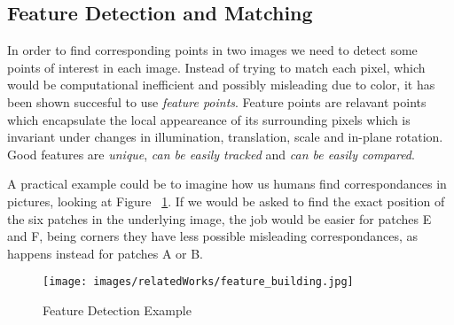  \subsection{Feature Detection and Matching }
 In order to find corresponding points in two images we need to detect some points of interest in each image.
 Instead of trying to match each pixel, which would be computational inefficient and possibly misleading due to color,
 it has been shown succesful to use \textit{feature points}. Feature points are relavant points which encapsulate the local
 appeareance of its surrounding pixels which is invariant under changes in illumination, translation, scale and in-plane rotation.
 Good features are \textit{unique}, \textit{can be easily tracked} and \textit{can be easily compared}.

 A practical example could be to imagine how us humans find correspondances in pictures, looking at Figure
~\ref{fig:sfm_opencv}. If we would be asked to find the exact position of the six patches in the underlying image,
the job would be easier for patches E and F, being corners they have less possible misleading correspondances, as happens
instead for patches A or B.
 \begin{figure}[H]
    \centering
    \texttt{[image: images/relatedWorks/feature\_building.jpg]} 
    \caption{Feature Detection Example~\cite{open_cv}}
    \label{fig:sfm_opencv}
\end{figure}


